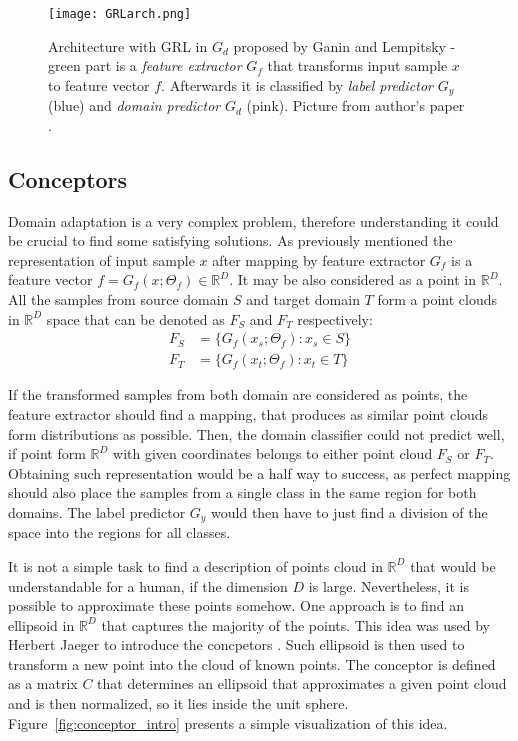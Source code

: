 \documentclass{article}
\begin{document}
\begin{figure}%
    \centering
    \texttt{[image: GRLarch.png]}%
    \caption{Architecture with GRL in $G_{d}$ proposed by Ganin and Lempitsky - green part is a \textit{feature extractor} $G_{f}$ that transforms input sample $x$ to feature vector $f$. Afterwards it is classified by \textit{label predictor} $G_{y}$ (blue) and \textit{domain predictor} $G_{d}$ (pink). Picture from author's paper \cite{pmlr-v37-ganin15}.}
    \label{fig:GRLarch}%
\end{figure}

\subsection{Conceptors}
Domain adaptation is a very complex problem, therefore understanding it could be crucial to find some satisfying solutions. As previously mentioned the representation of input sample $x$ after mapping by feature extractor $G_{f}$ is a feature vector $f = G_{f}(x ; \Theta_{f}) \in \mathbb{R}^{D}$. It may be also considered as a point in $\mathbb{R}^{D}$. All the samples from source domain $S$ and target domain $T$ form a point clouds in $\mathbb{R}^{D}$ space that can be denoted as $F_{S}$ and $F_{T}$ respectively:
\begin{align*}
    F_{S} &= \{ G_{f}(x_{s} ; \Theta_{f}) : x_{s} \in S  \} \\
    F_{T} &= \{ G_{f}(x_{t} ; \Theta_{f}) : x_{t} \in T  \}
\end{align*}
\par
If the transformed samples from both domain are considered as points, the feature extractor should find a mapping, that produces as similar point clouds form distributions as possible. Then, the domain classifier could not predict well, if point form $\mathbb{R}^{D}$ with given coordinates belongs to either point cloud $F_{S}$ or $F_{T}$. Obtaining such representation would be a half way to success, as perfect mapping should also place the samples from a single class in the same region for both domains. The label predictor $G_{y}$ would then have to just find a division of the space into the regions for all classes.
\par
It is not a simple task to find a description of points cloud in $\mathbb{R}^{D}$ that would be understandable for a human, if the dimension $D$ is large. Nevertheless, it is possible to approximate these points somehow. One approach is to find an ellipsoid in $\mathbb{R}^{D}$ that captures the majority of the points. This idea was used by Herbert Jaeger to introduce the concpetors \cite{conc}. Such ellipsoid is then used to transform a new point into the cloud of known points. The conceptor is defined as a matrix $C$ that determines an ellipsoid that approximates a given point cloud and is then normalized, so it lies inside the unit sphere. Figure~\ref{fig:conceptor_intro} presents a simple visualization of this idea.
\end{document}
